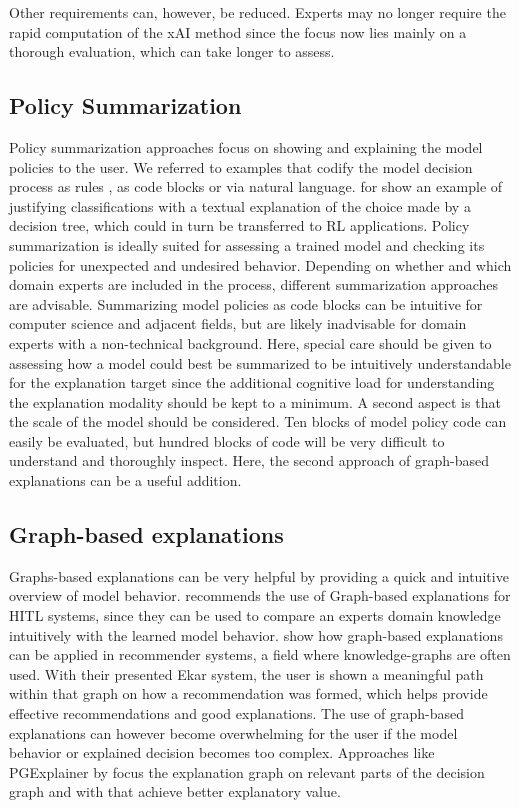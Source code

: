 \documentclass[twoside,11pt]{article}
\begin{document}
Other requirements can, however, be reduced. Experts may no longer require the rapid computation of the xAI method since the focus now lies mainly on a thorough evaluation, which can take longer to assess.

\subsection{Policy Summarization}
Policy summarization approaches focus on showing and explaining the model policies to the user. We referred to examples that codify the model decision process as rules \citep{LiuEtAl:2018:LinearModelUTrees}, as code blocks \citep{VermaEtAl:2018:ProgrammaticallyInterpretableRL} or via natural language. \citet{AlonsoEtAl:2018:xAINLBeerClassifier} for show an example of justifying classifications with a textual explanation of the choice made by a decision tree, which could in turn be transferred to RL applications.
Policy summarization is ideally suited for assessing a trained model and checking its policies for unexpected and undesired behavior. Depending on whether and which domain experts are included in the process, different summarization approaches are advisable. Summarizing model policies as code blocks can be intuitive for computer science and adjacent fields, but are likely inadvisable for domain experts with a non-technical background. Here, special care should be given to assessing how a model could best be summarized to be intuitively understandable for the explanation target since the additional cognitive load for understanding the explanation modality should be kept to a minimum.
A second aspect is that the scale of the model should be considered. Ten blocks of model policy code can easily be evaluated, but hundred blocks of code will be very difficult to understand and thoroughly inspect. Here, the second approach of graph-based explanations can be a useful addition.

\subsection{Graph-based explanations}

Graphs-based explanations can be very helpful by providing a quick and intuitive overview of model behavior. \citet{Holzinger:2016:iML} recommends the use of Graph-based explanations for HITL systems, since they can be used to compare an experts domain knowledge intuitively with the learned model behavior. \citet{SongEtAl:2019:ExplainableGraphBasedRecommendations} show how graph-based explanations can be applied in recommender systems, a field where knowledge-graphs are often used. With their presented Ekar system, the user is shown a meaningful path within that graph on how a recommendation was formed, which helps provide effective recommendations and good explanations.
The use of graph-based explanations can however become overwhelming for the user if the model behavior or explained decision becomes too complex. Approaches like PGExplainer by \citep{Vu:2020:PGMExplainer} focus the explanation graph on relevant parts of the decision graph and with that achieve better explanatory value.
\end{document}
